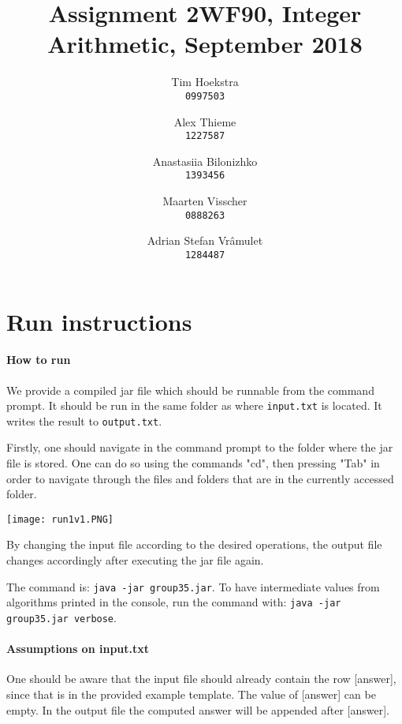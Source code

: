 \documentclass[a4paper]{article}
\title{Assignment 2WF90, Integer Arithmetic, September 2018}
\author{
    Tim Hoekstra\\
    \texttt{0997503}
    \and
    Alex Thieme\\
    \texttt{1227587}
    \and
    Anastasiia Bilonizhko\\
    \texttt{1393456}
    \and
    Maarten Visscher\\
    \texttt{0888263}
    \and
    Adrian Stefan Vr\^amulet\\
    \texttt{1284487}
}
\begin{document}
\maketitle



\tableofcontents




\section{Run instructions}



\paragraph{How to run}

We provide a compiled jar file which should be runnable from the command prompt.
It should be run in the same folder as where \texttt{input.txt} is located.
It writes the result to \texttt{output.txt}.

Firstly, one should navigate in the command prompt to the folder where the jar file is stored. One can do so using the commands "cd", then pressing "Tab" in order to navigate through the files and folders that are in the currently accessed folder. 

\texttt{[image: run1v1.PNG]}


By changing the input file according to the desired operations, the output file changes accordingly after executing the jar file again. 

The command is: \texttt{java -jar group35.jar}.
To have intermediate values from algorithms printed in the console, run the command with:
\texttt{java -jar group35.jar verbose}.

\paragraph{Assumptions on input.txt}

One should be aware that the input file should already contain the row [answer], since that is in the provided example template.
The value of [answer] can be empty.
In the output file the computed answer will be appended after [answer].
\end{document}

